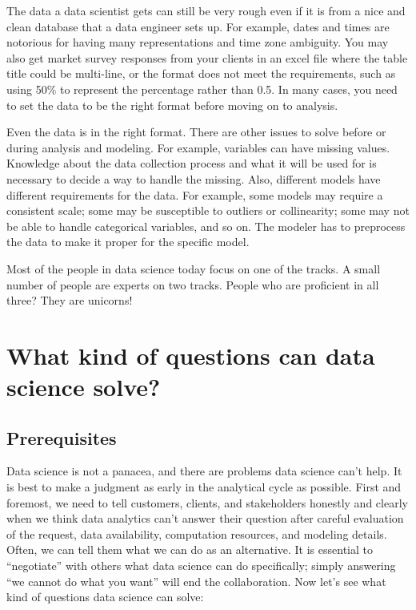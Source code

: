 \documentclass[12pt,]{krantz}
\begin{document}
The data a data scientist gets can still be very rough even if it is from a nice and clean database that a data engineer sets up. For example, dates and times are notorious for having many representations and time zone ambiguity. You may also get market survey responses from your clients in an excel file where the table title could be multi-line, or the format does not meet the requirements, such as using 50\% to represent the percentage rather than 0.5. In many cases, you need to set the data to be the right format before moving on to analysis.

Even the data is in the right format. There are other issues to solve before or during analysis and modeling. For example, variables can have missing values. Knowledge about the data collection process and what it will be used for is necessary to decide a way to handle the missing. Also, different models have different requirements for the data. For example, some models may require a consistent scale; some may be susceptible to outliers or collinearity; some may not be able to handle categorical variables, and so on. The modeler has to preprocess the data to make it proper for the specific model.

Most of the people in data science today focus on one of the tracks. A small number of people are experts on two tracks. People who are proficient in all three? They are unicorns!

\hypertarget{what-kind-of-questions-can-data-science-solve}{%
\section{What kind of questions can data science solve?}\label{what-kind-of-questions-can-data-science-solve}}

\hypertarget{prerequisites}{%
\subsection{Prerequisites}\label{prerequisites}}

Data science is not a panacea, and there are problems data science can't help. It is best to make a judgment as early in the analytical cycle as possible. First and foremost, we need to tell customers, clients, and stakeholders honestly and clearly when we think data analytics can't answer their question after careful evaluation of the request, data availability, computation resources, and modeling details. Often, we can tell them what we can do as an alternative. It is essential to ``negotiate'' with others what data science can do specifically; simply answering ``we cannot do what you want'' will end the collaboration. Now let's see what kind of questions data science can solve:
\end{document}

